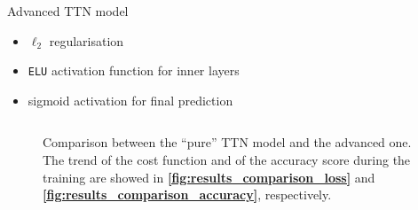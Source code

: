 \documentclass[xcolor=table,8pt]{beamer}
\begin{document}
\begin{frame}[t]
\begin{columns}
\begin{column}[t]{0.475\textwidth}
\begin{center}
\begin{block}{Advanced TTN model}
\begin{itemize}
\begin{itemize}
                                \item \( \ell_{2} \) regularisation
                                \item \texttt{ELU} activation function for inner layers
                                \item sigmoid activation for final prediction
                            \end{itemize}
                        \end{itemize}
                    \end{block}
                \end{center}
            \end{column}
        \end{columns}

        \vspace{4pt}
        \begin{figure}[!h]
            \begin{minipage}[c]{0.50\linewidth}
                \vspace{0pt}
                \centering
            \end{minipage}%
            \begin{minipage}[c]{0.50\linewidth}
                \vspace{0pt}
                \centering
            \end{minipage}%
            \vspace{-2pt}
            \caption{Comparison between the ``pure'' TTN model and the advanced one. The trend of the cost function and of the accuracy score during the training are showed in \textbf{\ref{fig:results_comparison_loss}} and \textbf{\ref{fig:results_comparison_accuracy}}, respectively.}
            \label{fig:results_comparison}
        \end{figure}
    \end{frame}
\end{document}
